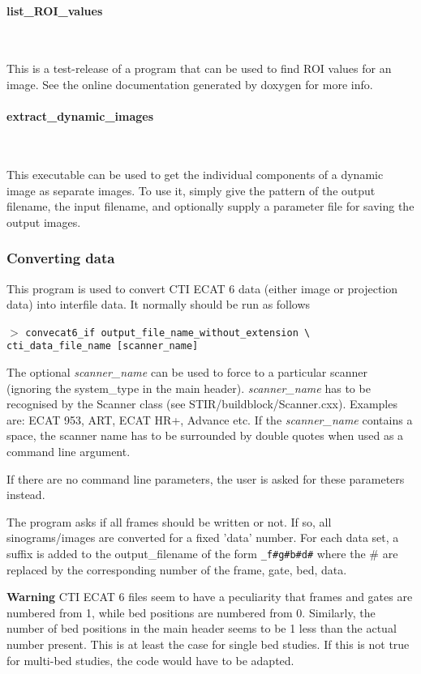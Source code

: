 \documentclass{article}
\newcommand{\subsubsubsection}[1]{\paragraph{#1}\mbox{} \\}
\newcommand{\cmdline}[1]{\par \noindent $>$ \texttt{#1}\par}
\begin{document}
{{{{ \subsubsubsection{list\_ROI\_values}
}

This is a test-release of a program that can be used to find 
ROI values for an image. See the online documentation generated 
by doxygen for more info.

{ \subsubsubsection{extract\_dynamic\_images}
}

This executable can be used to get the individual components of a 
dynamic image as separate images. 
To use it, simply give the pattern of the output filename, the input filename, and optionally
supply a parameter file for saving the output images.


\subsubsection{
Converting data}
\label{sec:convertingdata}
This program is used to convert CTI ECAT 6 data (either image 
or projection data) into interfile data. It normally should be 
run as follows
\cmdline{convecat6\_if output\_file\_name\_without\_extension {\textbackslash}\\
cti\_data\_file\_name [scanner\_name]}


The optional \textit{scanner\_name} can be used to force to a particular 
scanner (ignoring the system\_type in the main header). \textit{scanner\_name} 
has to be recognised by the Scanner class (see STIR/buildblock/Scanner.cxx). 
Examples are: ECAT 953, ART, ECAT HR+, Advance etc. If the \textit{scanner\_name} 
contains a space, the scanner name has to be surrounded by double 
quotes  when used as a command line argument.


If there are no command line parameters, the user is asked for 
these parameters instead. 


The program asks if all frames should be written or not. If so, 
all sinograms/images are converted for a fixed 'data' number. 
For each data set, a suffix is added to the output\_filename 
of the form \texttt{\_f\#g\#b\#d\#} where the \# are replaced 
by the corresponding number of the frame, gate, bed, data.



\textbf{Warning} CTI ECAT 6 files seem to have a peculiarity that 
frames and gates are numbered from 1, while bed positions are 
numbered from 0. Similarly, the number of bed positions in the 
main header seems to be 1 less than the actual number present. 
This is at least the case for single bed studies. If this is 
not true for multi-bed studies, the code would have to be adapted.


}}}
\end{document}
